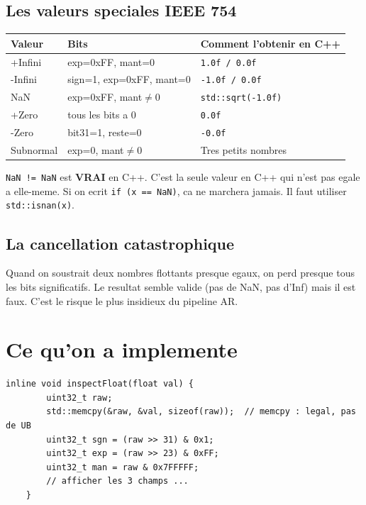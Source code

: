 \documentclass[12pt,a4paper]{report}
\newcommand{\code}[1]{\texttt{\textcolor{PrimaryBlue}{#1}}}
\begin{document}
\subsection*{Les valeurs speciales IEEE 754}

\begin{center}
\begin{tabular}{lll}
  \toprule
  \textbf{Valeur} & \textbf{Bits} & \textbf{Comment l'obtenir en C++} \\
  \midrule
  +Infini  & exp=0xFF, mant=0         & \code{1.0f / 0.0f} \\
  -Infini  & sign=1, exp=0xFF, mant=0 & \code{-1.0f / 0.0f} \\
  NaN      & exp=0xFF, mant$\neq$0   & \code{std::sqrt(-1.0f)} \\
  +Zero    & tous les bits a 0        & \code{0.0f} \\
  -Zero    & bit31=1, reste=0         & \code{-0.0f} \\
  Subnormal & exp=0, mant$\neq$0     & Tres petits nombres \\
  \bottomrule
\end{tabular}
\end{center}

\begin{warnbox}
\code{NaN != NaN} est \textbf{VRAI} en C++. C'est la seule valeur en C++ qui n'est pas egale a elle-meme. Si on ecrit \code{if (x == NaN)}, ca ne marchera jamais. Il faut utiliser \code{std::isnan(x)}.
\end{warnbox}

\subsection*{La cancellation catastrophique}

Quand on soustrait deux nombres flottants presque egaux, on perd presque tous les bits significatifs. Le resultat semble valide (pas de NaN, pas d'Inf) mais il est faux. C'est le risque le plus insidieux du pipeline AR.

\section{Ce qu'on a implemente}

\begin{lstlisting}[caption={Float.h : lire les bits d'un float (seule methode legale en C++17)}]
    inline void inspectFloat(float val) {
        uint32_t raw;
        std::memcpy(&raw, &val, sizeof(raw));  // memcpy : legal, pas de UB
        uint32_t sgn = (raw >> 31) & 0x1;
        uint32_t exp = (raw >> 23) & 0xFF;
        uint32_t man = raw & 0x7FFFFF;
        // afficher les 3 champs ...
    }
\end{lstlisting}
\end{document}
